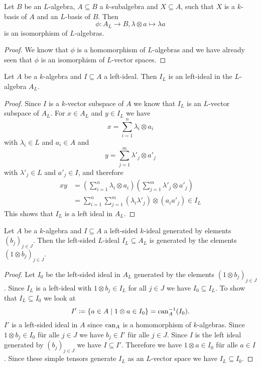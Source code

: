\begin{cor}\label{cor: inclusion to bijection algebras}
  Let $B$ be an $L$-algebra, $A \subseteq B$ a $k$-subalgebra and $X \subseteq A$, such that $X$ is a $k$-basis of $A$ and an $L$-basis of $B$.
  Then
  \[
            \phi
    \colon  A_L
    \to     B,
            \lambda \otimes a
    \mapsto \lambda a
  \]
  is an isomorphism of $L$-algebras.
\end{cor}
\begin{proof}
  We know that $\phi$ is a homomorphism of $L$-algebras and we have already seen that $\phi$ is an isomorphism of $L$-vector spaces.
\end{proof}


\begin{lem}
  Let $A$ be a $k$-algebra and $I \subseteq A$ a left-ideal.
  Then $I_L$ is an left-ideal in the $L$-algebra $A_L$.
\end{lem}
\begin{proof}
  Since $I$ is a $k$-vector subspace of $A$ we know that $I_L$ is an $L$-vector subspace of $A_L$.
  For $x \in A_L$ and $y \in I_L$ we have
  \[
    x = \sum_{i=1}^n \lambda_i \otimes a_i
  \]
  with $\lambda_i \in L$ and $a_i \in A$ and
  \[
    y = \sum_{j=1}^m \lambda'_j \otimes a'_j
  \]
  with $\lambda'_j \in L$ and $a'_j \in I$, and therefore
  \begin{align*}
        xy
    &=  \left( \sum_{i=1}^n \lambda_i \otimes a_i \right)
        \left( \sum_{j=1}^m \lambda'_j \otimes a'_j \right) \\
    &=  \sum_{i=1}^n \sum_{j=1}^m (\lambda_i \lambda'_j) \otimes (a_i a'_j)
    \in I_L
  \end{align*}
  This shows that $I_L$ is a left ideal in $A_L$.
\end{proof}


\begin{lem}
  Let $A$ be a $k$-algebra and $I \subseteq A$ a left-sided $k$-ideal generated by elements $(b_j)_{j \in J}$.
  Then the left-sided $L$-ideal $I_L \subseteq A_L$ is generated by the elements $(1 \otimes b_j)_{j \in J}$.
\end{lem}
\begin{proof}
  Let $I_0$ be the left-sided ideal in $A_L$ generated by the elements $(1 \otimes b_j)_{j \in J}$.
  Since $I_L$ is a left-ideal with $1 \otimes b_j \in I_L$ for all $j \in J$ we have $I_0 \subseteq I_L$.
  To show that $I_L \subseteq I_0$ we look at
  \[
              I'
    \coloneqq \{
                a \in A
              \mid
                1 \otimes a \in I_0
              \}
    =         \operatorname{can}_A^{-1}(I_0).
  \]
  $I'$ is a left-sided ideal in $A$ since $\operatorname{can}_A$ is a homomorphism of $k$-algebras.
  Since $1 \otimes b_j \in I_0$ für alle $j \in J$ we have $b_j \in I'$ für alle $j \in J$.
  Since $I$ is the left ideal generated by $(b_j)_{j \in J}$ we have $I \subseteq I'$.
  Therefore we have $1 \otimes a \in I_0$ für alle $a \in I$.
  Since these simple tensors generate $I_L$ as an $L$-vector space we have $I_L \subseteq I_0$.
\end{proof}


